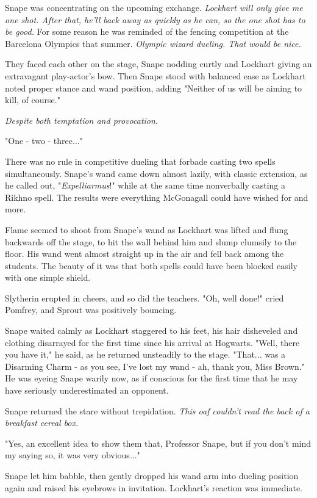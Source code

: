 \documentclass[a4paper,11pt]{article}
\begin{document}
Snape was concentrating on the upcoming exchange. \emph{Lockhart will only give me one shot. After that, he'll back away as quickly as he can, so the one shot has to be good.} For some reason he was reminded of the fencing competition at the Barcelona Olympics that summer. \emph{Olympic wizard dueling. That would be nice.}

They faced each other on the stage, Snape nodding curtly and Lockhart giving an extravagant play-actor's bow. Then Snape stood with balanced ease as Lockhart noted proper stance and wand position, adding "Neither of us will be aiming to kill, of course."

\emph{Despite both temptation and provocation}.

"One - two - three..."

There was no rule in competitive dueling that forbade casting two spells simultaneously. Snape's wand came down almost lazily, with classic extension, as he called out, "\emph{Expelliarmus}!" while at the same time nonverbally casting a Rikhno spell. The results were everything McGonagall could have wished for and more.

Flame seemed to shoot from Snape's wand as Lockhart was lifted and flung backwards off the stage, to hit the wall behind him and slump clumsily to the floor. His wand went almost straight up in the air and fell back among the students. The beauty of it was that both spells could have been blocked easily with one simple shield.

Slytherin erupted in cheers, and so did the teachers. "Oh, well done!" cried Pomfrey, and Sprout was positively bouncing.

Snape waited calmly as Lockhart staggered to his feet, his hair disheveled and clothing disarrayed for the first time since his arrival at Hogwarts. "Well, there you have it," he said, as he returned unsteadily to the stage. "That... was a Disarming Charm - as you see, I've lost my wand - ah, thank you, Miss Brown." He was eyeing Snape warily now, as if conscious for the first time that he may have seriously underestimated an opponent.

Snape returned the stare without trepidation. \emph{This oaf couldn't read the back of a breakfast cereal box.}

"Yes, an excellent idea to show them that, Professor Snape, but if you don't mind my saying so, it was very obvious..."

Snape let him babble, then gently dropped his wand arm into dueling position again and raised his eyebrows in invitation. Lockhart's reaction was immediate.
\end{document}
